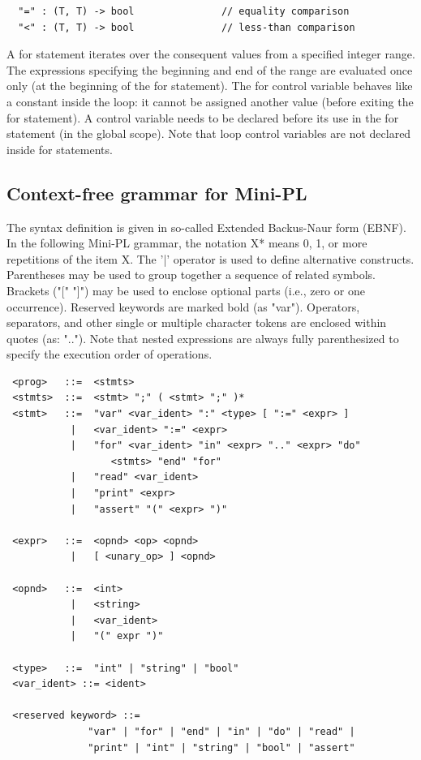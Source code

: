 \documentclass{article}
\begin{document}
\begin{verbatim}
  "=" : (T, T) -> bool               // equality comparison
  "<" : (T, T) -> bool               // less-than comparison
\end{verbatim}
A for statement iterates over the consequent values from a specified integer
range. The expressions specifying the beginning and end of the range are
evaluated once only (at the beginning of the for statement). The for control
variable behaves like a constant inside the loop: it cannot be assigned another
value (before exiting the for statement). A control variable needs to be
declared before its use in the for statement (in the global scope). Note that
loop control variables are not declared inside for statements.

\subsection{Context-free grammar for Mini-PL}
The syntax definition is given in so-called Extended Backus-Naur form (EBNF).
In the following Mini-PL grammar, the notation X* means 0, 1, or more
repetitions of the item X. The '|' operator is used to define alternative
constructs. Parentheses may be used to group together a sequence of related
symbols. Brackets ("[" "]") may be used to enclose optional parts (i.e., zero
or one occurrence). Reserved keywords are marked bold (as "var"). Operators,
separators, and other single or multiple character tokens are enclosed within
quotes (as: ".."). Note that nested expressions are always fully parenthesized
to specify the execution order of operations.

\begin{verbatim}
 <prog>   ::=  <stmts>
 <stmts>  ::=  <stmt> ";" ( <stmt> ";" )*
 <stmt>   ::=  "var" <var_ident> ":" <type> [ ":=" <expr> ]
           |   <var_ident> ":=" <expr>
           |   "for" <var_ident> "in" <expr> ".." <expr> "do"
                  <stmts> "end" "for"
           |   "read" <var_ident>
           |   "print" <expr>
           |   "assert" "(" <expr> ")"

 <expr>   ::=  <opnd> <op> <opnd>
           |   [ <unary_op> ] <opnd>

 <opnd>   ::=  <int>
           |   <string>
           |   <var_ident>
           |   "(" expr ")"

 <type>   ::=  "int" | "string" | "bool"
 <var_ident> ::= <ident>

 <reserved keyword> ::=
              "var" | "for" | "end" | "in" | "do" | "read" |
              "print" | "int" | "string" | "bool" | "assert"
\end{verbatim}
\end{document}
